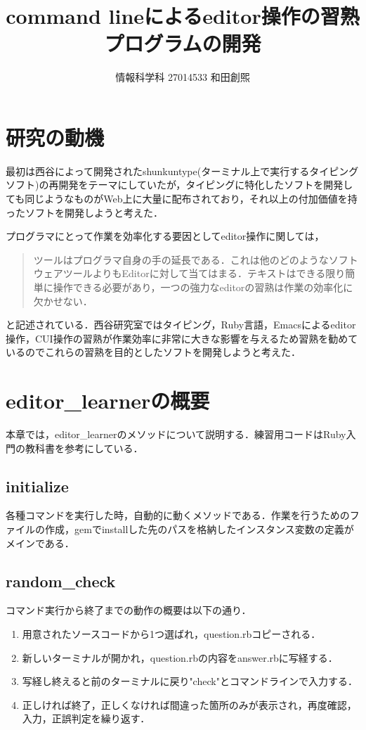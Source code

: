\documentclass[a4j,twocolumn]{jsarticle}
\def\tightlist{\itemsep1pt\parskip0pt\parsep0pt}
\begin{document}
\title{command lineによるeditor操作の習熟プログラムの開発}
\author{情報科学科 \hspace{5mm} 27014533 \hspace{5mm} 和田創煕}
\date{}
\maketitle


\section{研究の動機}
最初は西谷によって開発されたshunkuntype(ターミナル上で実行するタイピングソフト)の再開発をテーマにしていたが，タイピングに特化したソフトを開発しても同じようなものがWeb上に大量に配布されており，それ以上の付加価値を持ったソフトを開発しようと考えた．

プログラマにとって作業を効率化する要因としてeditor操作に関しては，


\begin{quotation}
ツールはプログラマ自身の手の延長である．これは他のどのようなソフトウェアツールよりもEditorに対して当てはまる．テキストはできる限り簡単に操作できる必要があり，一つの強力なeditorの習熟は作業の効率化に欠かせない\cite{達人プログラマー}． 
\end{quotation}
と記述されている．西谷研究室ではタイピング，Ruby言語，Emacsによるeditor操作，CUI操作の習熟が作業効率に非常に大きな影響を与えるため習熟を勧めているのでこれらの習熟を目的としたソフトを開発しようと考えた．


\section{editor\_learnerの概要}
本章では，editor\_learnerのメソッドについて説明する．練習用コードはRuby入門の教科書を参考にしている\cite{ruby}．
\subsection{initialize}
各種コマンドを実行した時，自動的に動くメソッドである．作業を行うためのファイルの作成，gemでinstallした先のパスを格納したインスタンス変数の定義がメインである．
\subsection{random\_check}
コマンド実行から終了までの動作の概要は以下の通り．
\begin{enumerate}
\def\labelenumi{\arabic{enumi}.}
\tightlist
\item
用意されたソースコードから1つ選ばれ，question.rbコピーされる．
\item
新しいターミナルが開かれ，question.rbの内容をanswer.rbに写経する．
\item
写経し終えると前のターミナルに戻り"check"とコマンドラインで入力する．
\item
正しければ終了，正しくなければ間違った箇所のみが表示され，再度確認，入力，正誤判定を繰り返す．
\end{enumerate}
\end{document}
